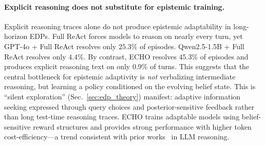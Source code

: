 \documentclass[11pt]{article}
\theoremstyle{plain}
\theoremstyle{definition}
\theoremstyle{remark}
\begin{document}
\vspace*{-3mm}
\paragraph{Explicit reasoning does not substitute for epistemic training.}
Explicit reasoning traces alone do not produce epistemic adaptability in long-horizon EDPs. Full ReAct forces models to reason on nearly every turn, yet GPT-4o + Full ReAct resolves only \(25.3\%\) of episodes. Qwen2.5-1.5B + Full ReAct resolves only \(4.4\%\). By contrast, \textsc{ECHO} resolves \(45.3\%\) of episodes and produces explicit reasoning text on only \(0.9\%\) of turns. This suggests that the central bottleneck for epistemic adaptivity is \textit{not} verbalizing intermediate reasoning, but learning a policy conditioned on the evolving belief state. This is “silent exploration” (Sec.~\ref{sec:edp_theory}) manifest: adaptive information seeking expressed through query choices and posterior-sensitive feedback rather than long test-time reasoning traces. \textsc{ECHO} trains adaptable models using belief-sensitive reward structures and provides strong performance with higher token cost-efficiency—a trend consistent with prior works~\citep{ma2025reasoningmodelseffectivethinking} in LLM reasoning.



\vspace*{-3mm}
\end{document}
